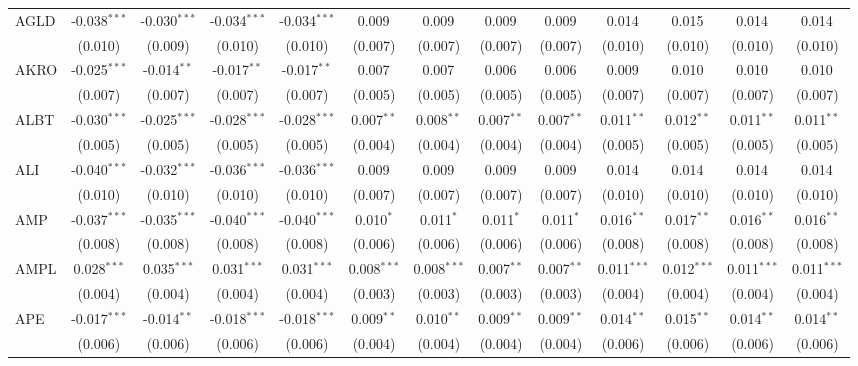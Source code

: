 \begin{table}[!htbp]
\begin{tabular}{@{\extracolsep{5pt}}lcccccccccccc}
 AGLD & -0.038$^{***}$ & -0.030$^{***}$ & -0.034$^{***}$ & -0.034$^{***}$ & 0.009$^{}$ & 0.009$^{}$ & 0.009$^{}$ & 0.009$^{}$ & 0.014$^{}$ & 0.015$^{}$ & 0.014$^{}$ & 0.014$^{}$ \\
  & (0.010) & (0.009) & (0.010) & (0.010) & (0.007) & (0.007) & (0.007) & (0.007) & (0.010) & (0.010) & (0.010) & (0.010) \\
 AKRO & -0.025$^{***}$ & -0.014$^{**}$ & -0.017$^{**}$ & -0.017$^{**}$ & 0.007$^{}$ & 0.007$^{}$ & 0.006$^{}$ & 0.006$^{}$ & 0.009$^{}$ & 0.010$^{}$ & 0.010$^{}$ & 0.010$^{}$ \\
  & (0.007) & (0.007) & (0.007) & (0.007) & (0.005) & (0.005) & (0.005) & (0.005) & (0.007) & (0.007) & (0.007) & (0.007) \\
 ALBT & -0.030$^{***}$ & -0.025$^{***}$ & -0.028$^{***}$ & -0.028$^{***}$ & 0.007$^{**}$ & 0.008$^{**}$ & 0.007$^{**}$ & 0.007$^{**}$ & 0.011$^{**}$ & 0.012$^{**}$ & 0.011$^{**}$ & 0.011$^{**}$ \\
  & (0.005) & (0.005) & (0.005) & (0.005) & (0.004) & (0.004) & (0.004) & (0.004) & (0.005) & (0.005) & (0.005) & (0.005) \\
 ALI & -0.040$^{***}$ & -0.032$^{***}$ & -0.036$^{***}$ & -0.036$^{***}$ & 0.009$^{}$ & 0.009$^{}$ & 0.009$^{}$ & 0.009$^{}$ & 0.014$^{}$ & 0.014$^{}$ & 0.014$^{}$ & 0.014$^{}$ \\
  & (0.010) & (0.010) & (0.010) & (0.010) & (0.007) & (0.007) & (0.007) & (0.007) & (0.010) & (0.010) & (0.010) & (0.010) \\
 AMP & -0.037$^{***}$ & -0.035$^{***}$ & -0.040$^{***}$ & -0.040$^{***}$ & 0.010$^{*}$ & 0.011$^{*}$ & 0.011$^{*}$ & 0.011$^{*}$ & 0.016$^{**}$ & 0.017$^{**}$ & 0.016$^{**}$ & 0.016$^{**}$ \\
  & (0.008) & (0.008) & (0.008) & (0.008) & (0.006) & (0.006) & (0.006) & (0.006) & (0.008) & (0.008) & (0.008) & (0.008) \\
 AMPL & 0.028$^{***}$ & 0.035$^{***}$ & 0.031$^{***}$ & 0.031$^{***}$ & 0.008$^{***}$ & 0.008$^{***}$ & 0.007$^{**}$ & 0.007$^{**}$ & 0.011$^{***}$ & 0.012$^{***}$ & 0.011$^{***}$ & 0.011$^{***}$ \\
  & (0.004) & (0.004) & (0.004) & (0.004) & (0.003) & (0.003) & (0.003) & (0.003) & (0.004) & (0.004) & (0.004) & (0.004) \\
 APE & -0.017$^{***}$ & -0.014$^{**}$ & -0.018$^{***}$ & -0.018$^{***}$ & 0.009$^{**}$ & 0.010$^{**}$ & 0.009$^{**}$ & 0.009$^{**}$ & 0.014$^{**}$ & 0.015$^{**}$ & 0.014$^{**}$ & 0.014$^{**}$ \\
  & (0.006) & (0.006) & (0.006) & (0.006) & (0.004) & (0.004) & (0.004) & (0.004) & (0.006) & (0.006) & (0.006) & (0.006) \\

\end{tabular}
\end{table}
